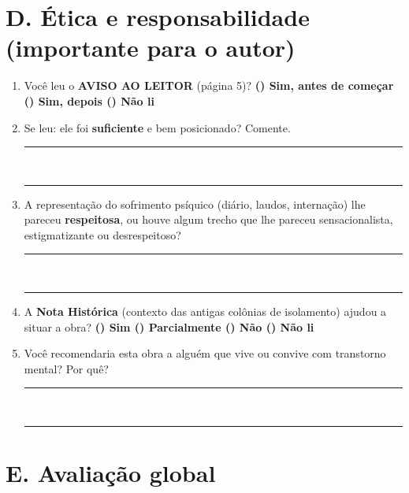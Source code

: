\documentclass[11pt,a4paper]{article}
\newcommand{\resp}[1]{\vspace{2pt}\textbf{#1}\vspace{4pt}}
\begin{document}
\section*{D. Ética e responsabilidade (importante para o autor)}
\begin{enumerate}[label=D\arabic*]
\item Você leu o \textbf{AVISO AO LEITOR} (página 5)? \quad \resp{() Sim, antes de começar \quad () Sim, depois \quad () Não li}
\item Se leu: ele foi \textbf{suficiente} e bem posicionado? Comente.\\[4pt]
  \rule{\textwidth}{0.3pt}\\[2pt]
  \rule{\textwidth}{0.3pt}
\item A representação do sofrimento psíquico (diário, laudos, internação) lhe pareceu \textbf{respeitosa}, ou houve algum trecho que lhe pareceu sensacionalista, estigmatizante ou desrespeitoso?\\[4pt]
  \rule{\textwidth}{0.3pt}\\[2pt]
  \rule{\textwidth}{0.3pt}
\item A \textbf{Nota Histórica} (contexto das antigas colônias de isolamento) ajudou a situar a obra? \quad \resp{() Sim \quad () Parcialmente \quad () Não \quad () Não li}
\item Você recomendaria esta obra a alguém que vive ou convive com transtorno mental? Por quê?\\[4pt]
  \rule{\textwidth}{0.3pt}\\[2pt]
  \rule{\textwidth}{0.3pt}
\end{enumerate}

\section*{E. Avaliação global}
\end{document}
